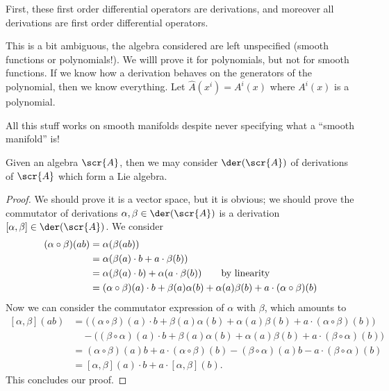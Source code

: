 First, these first order differential operators are derivations,
and moreover all derivations are first order differential
operators.

This is a bit ambiguous, the algebra considered are left
unspecified (smooth functions or polynomials!). We willl prove it
for polynomials, but not for smooth functions. If we know how a
derivation behaves on the generators of the polynomial, then we
know everything. Let $\widehat{A}(x^i)=A^i(x)$ where $A^i(x)$ is
a polynomial.

\begin{rmk}
All this stuff works on smooth manifolds despite never specifying
what a ``smooth manifold'' is!
\end{rmk}

\begin{thm}
Given an algebra $\scr{A}$, then we may consider $\der(\scr{A})$
of derivations of $\scr{A}$ which form a Lie algebra.
\end{thm}
\begin{proof}
We should prove it is a vector space, but it is obvious; we
should prove the commutator of derivations
$\alpha,\beta\in\der(\scr{A})$ is a derivation
$[\alpha,\beta]\in\der(\scr{A})$. We consider
\begin{subequations}
\begin{align}
(\alpha\circ\beta)(ab)&=\alpha(\beta(ab))\\
&=\alpha(\beta(a)\cdot b+a\cdot\beta(b))\\
&=\alpha(\beta(a)\cdot b)+\alpha(a\cdot \beta(b))\qquad\hbox{by linearity}\\
&=(\alpha\circ\beta)(a)\cdot b+\beta(a)\alpha(b)+\alpha(a)\beta(b)+a\cdot(\alpha\circ\beta)(b)
\end{align}
\end{subequations}
Now we can consider the commutator expression of $\alpha$ with
$\beta$, which amounts to
\begin{subequations}
\begin{align}
[\alpha,\beta](ab) &= \bigg((\alpha\circ\beta)(a)\cdot b+\beta(a)\alpha(b)+\alpha(a)\beta(b)+a\cdot(\alpha\circ\beta)(b)\bigg)\nonumber\\
&\quad-\bigg((\beta\circ\alpha)(a)\cdot b+\beta(a)\alpha(b)+\alpha(a)\beta(b)+a\cdot(\beta\circ\alpha)(b)\bigg)\\
&=(\alpha\circ\beta)(a)b+a\cdot(\alpha\circ\beta)(b)-(\beta\circ\alpha)(a)b-a\cdot(\beta\circ\alpha)(b)\\
&=[\alpha,\beta](a)\cdot b+a\cdot[\alpha,\beta](b).
\end{align}
\end{subequations}
This concludes our proof.
\end{proof}

